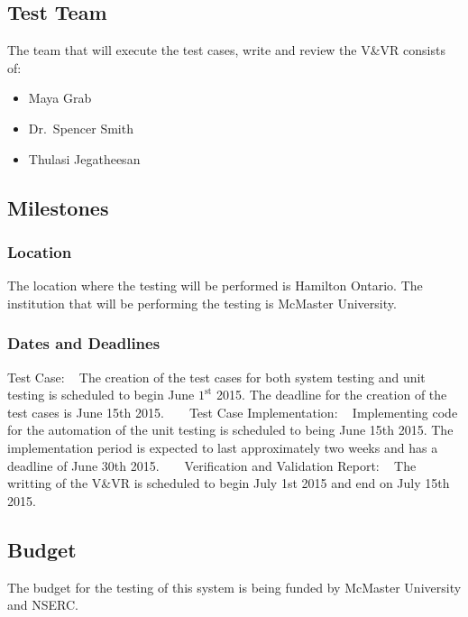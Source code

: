 \documentclass[12pt]{article}
\begin{document}
\subsection{Test Team} 
The team that will execute the test cases, write and review the V\&VR consists of:

\begin{itemize}
 \item Maya Grab 
 \item Dr.\ Spencer Smith
 \item Thulasi Jegatheesan 
\end{itemize}  

\subsection{Milestones}

\subsubsection{Location}
The location where the testing will be performed is Hamilton Ontario. The institution that
will be performing the testing is McMaster University. 


\subsubsection{Dates and Deadlines}
Test Case:
~\newline
The creation of the test cases for both system testing and unit testing is 
scheduled to begin June $1^\text{st}$ 2015.
The deadline for the creation of the test cases is June 15th 2015. 
~\newline
~\newline
Test Case Implementation:
~\newline
Implementing code for the automation of the unit testing is scheduled to being 
June 15th 2015. The implementation period
is expected to last approximately two weeks and has a deadline of June 30th 2015.
~\newline
~\newline
Verification and Validation Report:
~\newline
The writting of the V\&VR is scheduled to begin July 1st 2015 and end on July 15th 2015. 

\subsection{Budget}
The budget for the testing of this system is being funded by McMaster University and NSERC.
\end{document}
